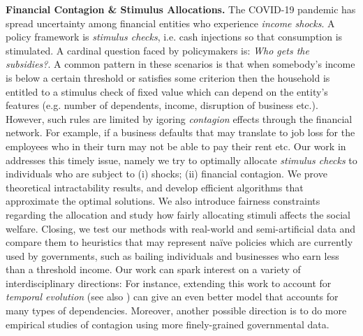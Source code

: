 \documentclass[11pt]{article}
\begin{document}
\noindent \textbf{Financial Contagion \& Stimulus Allocations.} The COVID-19 pandemic has spread uncertainty among financial entities who experience \emph{income shocks}. A policy framework is \emph{stimulus checks}, i.e. cash injections so that consumption is stimulated. A cardinal question faced by policymakers is: \emph{Who gets the subsidies?}. 
A common pattern in these scenarios is that when somebody's income is below a certain threshold or satisfies some criterion then the household is entitled to a stimulus check of fixed value which can depend on the entity's features (e.g. number of dependents, income, disruption of business etc.). However, such rules are limited by igoring \emph{contagion} effects through the financial network. For example, if a business defaults that may translate to job loss for the employees who in their turn may not be able to pay their rent etc. Our work in \cite{papachristou2021allocating} addresses this timely issue, namely we try to optimally allocate \emph{stimulus checks} to individuals who are subject to (i) shocks; (ii) financial contagion. We prove theoretical intractability results, and develop efficient algorithms that approximate the  optimal solutions. We also introduce fairness constraints regarding the allocation and study how fairly allocating stimuli affects the social welfare. 
Closing, we test our methods with real-world and semi-artificial data and compare them to heuristics that may represent na\"ive policies which are currently used by governments, such as bailing individuals and businesses who earn less than a threshold income.
Our work can spark interest on a variety of interdisciplinary directions: For instance, extending this work to account for \emph{temporal evolution} (see also \cite{abebe2020subsidy}) can give an even better model that accounts for many types of dependencies.
Moreover, another possible direction is to do more empirical studies of contagion using more finely-grained governmental data.

\end{document}
